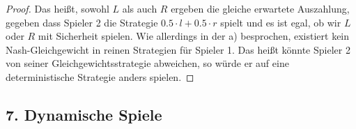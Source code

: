\documentclass[12pt]{article}
\begin{document}
\begin{enumerate}[label=\alph*\upshape)]
\begin{proof}
			Das heißt, sowohl $L$ als auch $R$ ergeben die gleiche erwartete Auszahlung, gegeben dass Spieler 2 die Strategie $0.5 \cdot l + 0.5 \cdot r$ spielt und es ist egal, ob wir $L$ oder $R$ mit Sicherheit spielen. Wie allerdings in der a) besprochen, existiert kein Nash-Gleichgewicht in reinen Strategien für Spieler 1. Das heißt könnte Spieler 2 von seiner Gleichgewichtsstrategie abweichen, so würde er auf eine deterministische Strategie anders spielen.
		\end{proof}
\end{enumerate}

\newpage

\subsection*{7. Dynamische Spiele}
\end{document}
